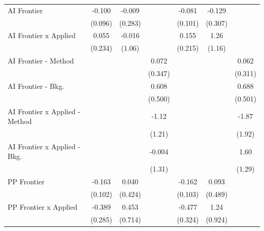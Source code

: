 \begin{tabular}{lcccccc}
   AI Frontier                    & -0.100        & -0.009        &               & -0.081        & -0.129       &   \\   
                                  & (0.096)       & (0.283)       &               & (0.101)       & (0.307)      &   \\   
   AI Frontier x Applied          & 0.055         & -0.016        &               & 0.155         & 1.26         &   \\   
                                  & (0.234)       & (1.06)        &               & (0.215)       & (1.16)       &   \\   
   AI Frontier - Method           &               &               & 0.072         &               &              & 0.062\\   
                                  &               &               & (0.347)       &               &              & (0.311)\\   
   AI Frontier - Bkg.             &               &               & 0.608         &               &              & 0.688\\   
                                  &               &               & (0.500)       &               &              & (0.501)\\   
   AI Frontier x Applied - Method &               &               & -1.12         &               &              & -1.87\\   
                                  &               &               & (1.21)        &               &              & (1.92)\\   
   AI Frontier x Applied - Bkg.   &               &               & -0.004        &               &              & 1.60\\   
                                  &               &               & (1.31)        &               &              & (1.29)\\   
   PP Frontier                    & -0.163        & 0.040         &               & -0.162        & 0.093        &   \\   
                                  & (0.102)       & (0.424)       &               & (0.103)       & (0.489)      &   \\   
   PP Frontier x Applied          & -0.389        & 0.453         &               & -0.477        & 1.24         &   \\   
                                  & (0.285)       & (0.714)       &               & (0.324)       & (0.924)      &   \\   

\end{tabular}
